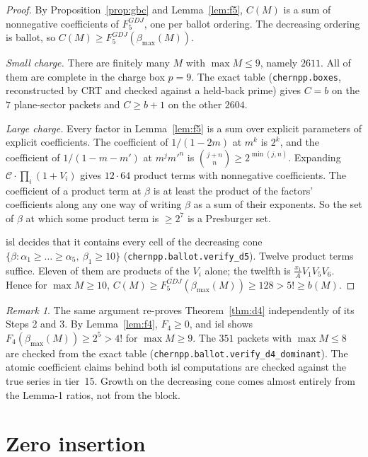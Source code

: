 \documentclass[11pt,a4paper]{article}
\theoremstyle{plain}
\theoremstyle{definition}
\theoremstyle{remark}
\newtheorem{remark}[theorem]{Remark}
\begin{document}
\begin{proof}
By Proposition~\ref{prop:gbc} and Lemma~\ref{lem:f5}, $C(M)$ is a sum of nonnegative coefficients
of $F_5^{GDJ}$, one per ballot ordering. The decreasing ordering is ballot, so
$C(M) \ge F_5^{GDJ}(\beta_{\max}(M))$.

\emph{Small charge.} There are finitely many $M$ with $\max M \le 9$, namely $2611$. All of them
are complete in the charge box $p = 9$. The exact table (\texttt{chernpp.boxes}, reconstructed by
CRT and checked against a held-back prime) gives $C = b$ on the $7$ plane-sector packets and
$C \ge b + 1$ on the other $2604$.

\emph{Large charge.} Every factor in Lemma~\ref{lem:f5} is a sum over explicit parameters of
explicit coefficients. The coefficient of $1/(1-2m)$ at $m^k$ is $2^k$, and the coefficient of
$1/(1-m-m')$ at $m^{j}m'^{n}$ is $\binom{j+n}{n} \ge 2^{\min(j,n)}$. Expanding
$\mathcal C \cdot \prod_i(1+V_i)$ gives $12 \cdot 64$ product terms with nonnegative coefficients. The
coefficient of a product term at $\beta$ is at least the product of the factors' coefficients along
any one way of writing $\beta$ as a sum of their exponents. So the set of $\beta$ at which some
product term is $\ge 2^7$ is a Presburger set.

isl decides that it contains every cell of the decreasing cone
$\{\beta : \alpha_1 \ge \dots \ge \alpha_5,\ \beta_1 \ge 10\}$
(\texttt{chernpp.ballot.verify\_d5}). Twelve product terms suffice. Eleven of them are products of
the $V_i$ alone; the twelfth is $\frac{x_1}{A}V_1V_5V_6$. Hence for $\max M \ge 10$,
$C(M) \ge F_5^{GDJ}(\beta_{\max}(M)) \ge 128 > 5! \ge b(M)$.
\end{proof}

\begin{remark}
The same argument re-proves Theorem~\ref{thm:d4} independently of its Steps 2 and 3. By
Lemma~\ref{lem:f4}, $F_4 \ge 0$, and isl shows $F_4(\beta_{\max}(M)) \ge 2^5 > 4!$ for
$\max M \ge 9$. The $351$ packets with $\max M \le 8$ are checked from the exact table
(\texttt{chernpp.ballot.verify\_d4\_dominant}). The atomic coefficient claims behind both
isl computations are checked against the true series in tier~15. Growth on the decreasing cone
comes almost entirely from the Lemma-1 ratios, not from the block.
\end{remark}

\section{Zero insertion}
\end{document}

